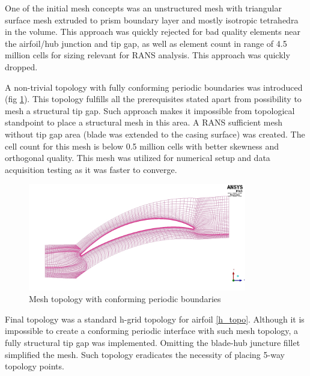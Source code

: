 
One of the initial mesh concepts was an unstructured mesh with triangular surface mesh extruded to prism boundary layer and mostly isotropic tetrahedra in the volume. This approach was quickly rejected for bad quality elements near the airfoil/hub junction and tip gap, as well as element count in range of 4.5 million cells for sizing relevant for RANS analysis. This approach was quickly dropped.

A non-trivial topology with fully conforming periodic boundaries was introduced (fig \ref{cj_topo}). This topology fulfills all the prerequisites stated apart from possibility to mesh a structural tip gap. Such approach makes it impossible from topological standpoint to place a structural mesh in this area. A RANS sufficient mesh without tip gap area (blade was extended to the casing surface) was created. The cell count for this mesh is below 0.5 million cells with better skewness and orthogonal quality. This mesh was utilized for numerical setup and data acquisition testing as it was faster to converge.

\begin{figure}[h!]
\centering %
\includegraphics[width=0.85\textwidth]{Pictures/r67_cj.jpg}
\caption{Mesh topology with conforming periodic boundaries}
\label{cj_topo}
\end{figure}

Final topology was a standard h-grid topology for airfoil \ref{h_topo}. Although it is impossible to create a conforming periodic interface with such mesh topology, a fully structural tip gap was implemented. Omitting the blade-hub juncture fillet simplified the mesh.  Such topology eradicates the necessity of placing 5-way topology points.

